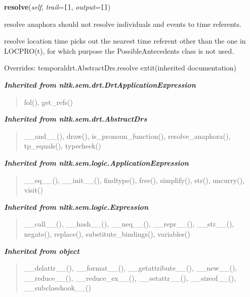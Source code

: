     \vspace{0.5ex}

\hspace{.8\funcindent}\begin{boxedminipage}{\funcwidth}

    \raggedright \textbf{resolve}(\textit{self}, \textit{trail}={\tt \texttt{[}\texttt{]}}, \textit{output}={\tt \texttt{[}\texttt{]}})

\setlength{\parskip}{2ex}
    resolve anaphora should not resolve individuals and events to time 
    referents.

    resolve location time picks out the nearest time referent other than 
    the one in LOCPRO(t), for which purpose the PossibleAntecedents class 
    is not used.

\setlength{\parskip}{1ex}
      Overrides: temporaldrt.AbstractDrs.resolve 	extit{(inherited documentation)}

    \end{boxedminipage}


\large{\textbf{\textit{Inherited from nltk.sem.drt.DrtApplicationExpression}}}

\begin{quote}
fol(), get\_refs()
\end{quote}

\large{\textbf{\textit{Inherited from nltk.sem.drt.AbstractDrs}}}

\begin{quote}
\_\_and\_\_(), draw(), is\_pronoun\_function(), resolve\_anaphora(), tp\_equals(), typecheck()
\end{quote}

\large{\textbf{\textit{Inherited from nltk.sem.logic.ApplicationExpression}}}

\begin{quote}
\_\_eq\_\_(), \_\_init\_\_(), findtype(), free(), simplify(), str(), uncurry(), visit()
\end{quote}

\large{\textbf{\textit{Inherited from nltk.sem.logic.Expression}}}

\begin{quote}
\_\_call\_\_(), \_\_hash\_\_(), \_\_neq\_\_(), \_\_repr\_\_(), \_\_str\_\_(), negate(), replace(), substitute\_bindings(), variables()
\end{quote}

\large{\textbf{\textit{Inherited from object}}}

\begin{quote}
\_\_delattr\_\_(), \_\_format\_\_(), \_\_getattribute\_\_(), \_\_new\_\_(), \_\_reduce\_\_(), \_\_reduce\_ex\_\_(), \_\_setattr\_\_(), \_\_sizeof\_\_(), \_\_subclasshook\_\_()
\end{quote}

